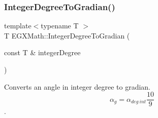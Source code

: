 \mbox{\label{group___e_g_x_math-_angle_conversions-_integer_degree_ga47127467ff7a8ef57f6be9ce496a97df}} 
\subsubsection{\texorpdfstring{Integer\+Degree\+To\+Gradian()}{IntegerDegreeToGradian()}}
{\footnotesize\ttfamily template$<$typename T $>$ \\
T E\+G\+X\+Math\+::\+Integer\+Degree\+To\+Gradian (\begin{DoxyParamCaption}\item[{const T \&}]{integer\+Degree }\end{DoxyParamCaption})}



Converts an angle in integer degree to gradian. \[\alpha_{g}=\alpha_{deg\ int}\frac{10}{9}\]. 

